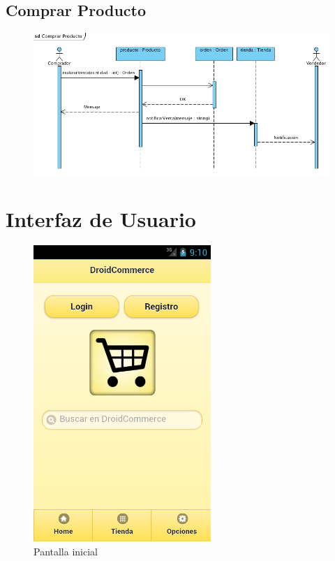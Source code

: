 \subsection{Comprar Producto}
\begin{figure}[H]
  \centering
    \includegraphics[width=1\textwidth]{imagenes/disenio/secuencia-comprar-producto.png}
    \label{fig:diagrama-secuencia-comprar-producto}
\end{figure}

\section{Interfaz de Usuario}

\begin{figure}[H]
  \centering
    \includegraphics[width=0.6\textwidth]{imagenes/capturas/home.png}
        \caption{Pantalla inicial}
    \label{fig:home}
\end{figure}

